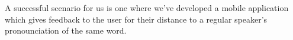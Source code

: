 A successful scenario for us is one where we've developed a mobile application which gives feedback to the user for their distance to a regular speaker's pronounciation of the same word.
